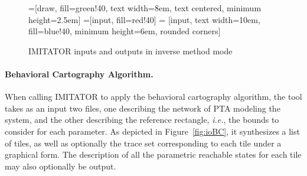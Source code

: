 \documentclass[a4paper,11pt]{report}
\newcommand{\A}{\mathcal{A}}
\newcommand{\imitator}{\textsf{IMITATOR}}
\newcommand{\paragraphe}[1]{\paragraph{#1.}}
\newcommand{\ie}{\textcolor{colorok}{\textit{i.e.}, }}
\begin{document}
\begin{figure}[ht!]
=[draw, fill=green!40, text width=8em,
    text centered, minimum height=2.5em]
=[input, fill=red!40]
 = [input, text width=10em, fill=blue!40,
    minimum height=6em, rounded corners]
\def\blockdist{2.3}
\def\edgedist{2.5}

{

\centering


}

\caption{\imitator{} inputs and outputs in inverse method mode}
\label{fig:ioIM}
\end{figure}


\paragraphe{Behavioral Cartography Algorithm}
When calling \imitator{} to apply the behavioral cartography algorithm, the tool takes as an input two files, one describing the network of PTA modeling the system, and the other describing the reference rectangle, \ie{} the bounds to consider for each parameter.
As depicted in Figure~\ref{fig:ioBC}, it synthesizes a list of tiles, as well as optionally the trace set corresponding to each tile under a graphical form.
The description of all the parametric reachable states for each tile may also optionally be output.
\end{document}
